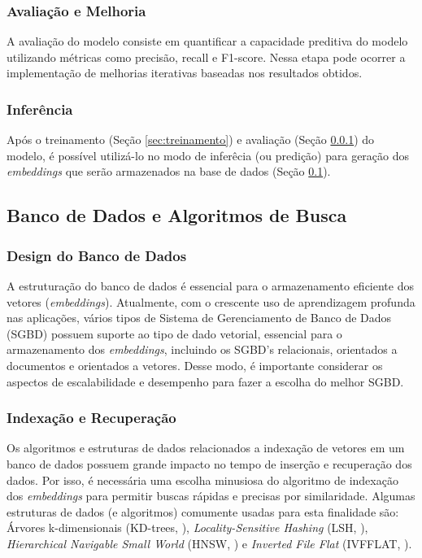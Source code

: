 \documentclass[a4,12pt]{horizon-theme}
\begin{document}
\subsubsection{Avaliação e Melhoria}
\label{sec:avaliacao}
A avaliação do modelo consiste em quantificar a capacidade preditiva do modelo utilizando métricas como precisão, recall e F1-score. Nessa etapa pode ocorrer a implementação de melhorias iterativas baseadas nos resultados obtidos.

\subsubsection{Inferência}
\label{sec:inferencia}
Após o treinamento (Seção \ref{sec:treinamento}) e avaliação (Seção \ref{sec:avaliacao}) do modelo, é possível utilizá-lo  no modo de inferêcia (ou predição) para geração dos \emph{embeddings} que serão armazenados na base de dados (Seção \ref{sec:db}).




\subsection{Banco de Dados e Algoritmos de Busca}
\label{sec:db}
\subsubsection{Design do Banco de Dados}
A estruturação do banco de dados é essencial para o armazenamento eficiente dos vetores (\emph{embeddings}). Atualmente, com o crescente uso de aprendizagem profunda nas aplicações, vários tipos de Sistema de Gerenciamento de Banco de Dados (SGBD) possuem suporte ao tipo de dado vetorial, essencial para o armazenamento dos \emph{embeddings}, incluindo os SGBD's relacionais, orientados a documentos e orientados a vetores. Desse modo, é importante considerar os aspectos de escalabilidade e desempenho para fazer a escolha do melhor SGBD.

\subsubsection{Indexação e Recuperação}
Os algoritmos e estruturas de dados relacionados a indexação de vetores em um banco de dados possuem grande impacto no tempo de inserção e recuperação dos dados. Por isso, é necessária uma escolha minusiosa do algoritmo de indexação dos \emph{embeddings} para permitir buscas rápidas e precisas por similaridade. Algumas estruturas de dados (e algoritmos) comumente usadas para esta finalidade são: Árvores k-dimensionais (KD-trees, \cite{kdtree}), \emph{Locality-Sensitive Hashing} (LSH, \cite{lsh}), \emph{Hierarchical Navigable Small World} (HNSW, \cite{hnsw}) e \emph{Inverted File Flat} (IVFFLAT, \cite{ivfflat}).
\end{document}
